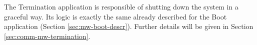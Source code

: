 \label{sec:mw-termination-descr}

The Termination application is responsible of shutting down the system in a
graceful way. Its logic is exactly the same already described for the Boot
application (Section \ref{sec:mw-boot-descr}). Further details will be given
in Section \ref{sec:comm-mw-termination}.